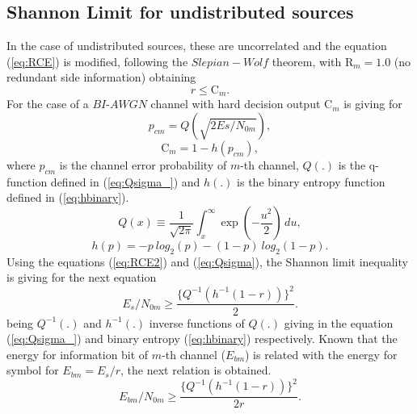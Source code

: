 \subsection{Shannon Limit for undistributed sources}
\label{Subsubsec:LimShannonnaodist}
In the case of undistributed sources, these are uncorrelated  and the equation (\ref{eq:RCE}) 
is modified, following the $Slepian-Wolf$ theorem, with $\mathrm{R}_m=1.0$ (no redundant side information) obtaining
\begin{equation} \label{eq:RCE2}
r  \leq \mathrm{C}_m.
\end{equation}
For the case of a $BI$-$AWGN$ channel with hard decision output $\mathrm{C}_m$ is giving for
\begin{equation} \label{eq:pcm}
p_{cm}=Q(\sqrt{2 Es/ N_{0m}}),
\end{equation}
\begin{equation} \label{eq:Qsigma}
\mathrm{C}_{m}=1-h(p_{cm}),
\end{equation}
where $p_{cm}$ is the channel error probability  of $m$-th channel, $Q(.)$ is the q-function defined 
in (\ref{eq:Qsigma_}) and $h(.)$ is the binary entropy function defined in (\ref{eq:hbinary}).
\begin{equation} \label{eq:Qsigma_}
Q(x) \equiv \frac{1}{\sqrt{2\pi}} \int_x^\infty \exp\left(-\frac{u^2}{2}\right) \, du,
\end{equation}
\begin{equation}\label{eq:hbinary}
 h(p)=-p~log_2(p)-(1-p)~log_2(1-p).
\end{equation}
Using the equations (\ref{eq:RCE2}) and (\ref{eq:Qsigma}),
the Shannon limit inequality is giving for the next equation
\begin{equation} \label{eq:shannonbiawgnhard}
E_s/N_{0m} \geq \frac{\{Q^{-1}(h^{-1}(1-r))\}^2}{2}.
\end{equation}
being $Q^{-1}(.)$ and $h^{-1}(.)$ inverse functions of $Q(.)$ giving in the equation 
(\ref{eq:Qsigma_}) and binary entropy (\ref{eq:hbinary}) respectively.
Known that the energy for information bit of $m$-th channel ($E_{bm}$) is related with the energy for symbol 
for $E_{bm} = E_s/r$, the next relation is obtained.
\begin{equation} \label{eq:shannonbiawgnhard0}
E_{bm}/N_{0m} \geq \frac{\{Q^{-1}(h^{-1}(1-r))\}^2}{2r}.
\end{equation}


